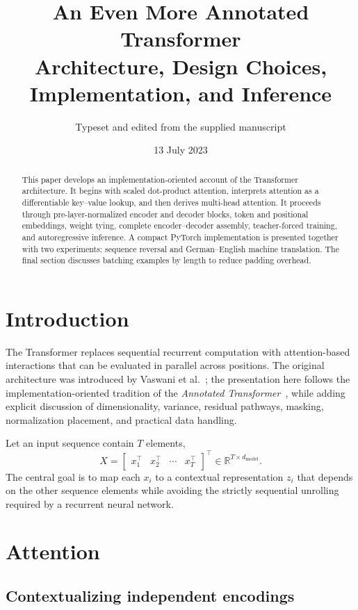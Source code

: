 \documentclass[11pt]{article}
\title{An Even More Annotated Transformer\\
\large Architecture, Design Choices, Implementation, and Inference}
\author{Typeset and edited from the supplied manuscript}
\date{13 July 2023}
\newcommand{\R}{\mathbb{R}}
\begin{document}
\maketitle

\begin{abstract}
This paper develops an implementation-oriented account of the Transformer architecture. It begins with scaled dot-product attention, interprets attention as a differentiable key--value lookup, and then derives multi-head attention. It proceeds through pre-layer-normalized encoder and decoder blocks, token and positional embeddings, weight tying, complete encoder--decoder assembly, teacher-forced training, and autoregressive inference. A compact PyTorch implementation is presented together with two experiments: sequence reversal and German--English machine translation. The final section discusses batching examples by length to reduce padding overhead.
\end{abstract}

\tableofcontents
\newpage

\section{Introduction}

The Transformer replaces sequential recurrent computation with attention-based interactions that can be evaluated in parallel across positions. The original architecture was introduced by Vaswani et al.~\cite{vaswani2017attention}; the presentation here follows the implementation-oriented tradition of the \emph{Annotated Transformer}~\cite{rush2018annotated}, while adding explicit discussion of dimensionality, variance, residual pathways, masking, normalization placement, and practical data handling.

Let an input sequence contain $T$ elements,
\[
X = \begin{bmatrix}x_1^\top & x_2^\top & \cdots & x_T^\top\end{bmatrix}^\top
\in \R^{T\times d_{\mathrm{model}}}.
\]
The central goal is to map each $x_i$ to a contextual representation $z_i$ that depends on the other sequence elements while avoiding the strictly sequential unrolling required by a recurrent neural network.

\section{Attention}
\label{sec:attention}

\subsection{Contextualizing independent encodings}
\end{document}
